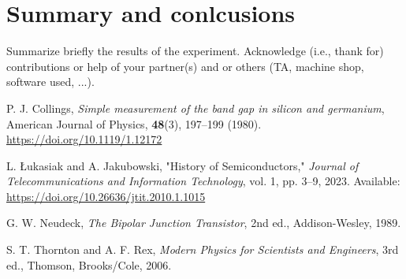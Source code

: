 \documentclass[12pt,letterpaper,twocolumn]{article}
\begin{document}
\section{Summary and conlcusions}

Summarize briefly the results of the experiment.
Acknowledge (i.e., thank for) contributions or help
of your partner(s) and or
others (TA, machine shop, software used, ...).


\begin{thebibliography}{9}

P. J. Collings, 
\textit{Simple measurement of the band gap in silicon and germanium}, 
American Journal of Physics, \textbf{48}(3), 197--199 (1980). 
\href{https://doi.org/10.1119/1.12172}{https://doi.org/10.1119/1.12172}

L. Łukasiak and A. Jakubowski, 
"History of Semiconductors," 
\textit{Journal of Telecommunications and Information Technology}, vol. 1, pp. 3–9, 2023. 
Available: \url{https://doi.org/10.26636/jtit.2010.1.1015}

G. W. Neudeck, 
\textit{The Bipolar Junction Transistor}, 2nd ed., 
Addison-Wesley, 1989.

S. T. Thornton and A. F. Rex, 
\textit{Modern Physics for Scientists and Engineers}, 3rd ed., 
Thomson, Brooks/Cole, 2006.

\end{thebibliography}

\end{document}
